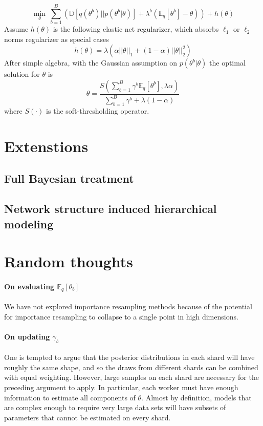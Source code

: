 \documentclass{article}
\newcommand{\1}[0]{\ensuremath{\boldsymbol{1}}\xspace}
\begin{document}
\begin{equation}
\min_{\theta}~ \sum_{b=1}^B\left( \mathbb{D}[q(\theta^b)||p(\theta^b|\theta)] + \lambda^b(\mathbb{E}_q[\theta^b] - \theta)\right) + h(\theta)
\end{equation}
Assume $h(\theta)$ is the following elastic net regularizer, which absorbs $\ell_1$ or $\ell_2$ norms regularizer as special cases
\begin{equation}\label{en}
h(\theta) = \lambda(\alpha||\theta||_1 + (1-\alpha)||\theta||^2_2)
\end{equation}
After simple algebra, with the Gaussian assumption on $p(\theta^b|\theta)$ the optimal solution for $\theta$ is
\begin{equation}
\theta = \frac{S\left(\sum_{b=1}^B\gamma^b\mathbb{E}_q[\theta^b], \lambda\alpha \right)}{\sum_{b=1}^B\gamma^b + \lambda(1-\alpha)}
\end{equation}
where $S(\cdot)$ is the soft-thresholding operator. 


\section{Extenstions}
\subsection{Full Bayesian treatment}
\subsection{Network structure induced hierarchical modeling}


\section{Random thoughts}

\paragraph{On evaluating $\mathbb{E}_q[\theta_b]$} We have not explored importance resampling methods because of the potential for importance resampling to collapse to a single point in high dimensions.
\paragraph{On updating $\gamma_b$} One is tempted to argue that the posterior distributions in each shard will have roughly the same shape, and so the draws from different shards can be combined with equal weighting. However, large samples on each shard are necessary for the preceding argument to apply. In particular, each worker must have enough information to estimate all components of $\theta$. Almost by definition, models that are complex enough to require very large data sets will have subsets of parameters that cannot be estimated on every shard.
\end{document}
